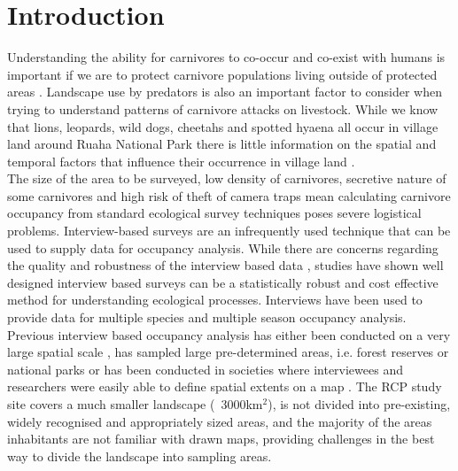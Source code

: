 \section*{Introduction}

Understanding the ability for carnivores to co-occur and co-exist with humans is important if we are to protect carnivore populations living outside of protected areas \cite{Carter2012,woodroffe2005people,Dickman2011}. Landscape use by predators is also an important factor to consider when trying to understand patterns of carnivore attacks on livestock. While we know that lions, leopards, wild dogs, cheetahs and spotted hyaena all occur in village land around Ruaha National Park \cite{Dickman2008,Abade2014g} there is little information on the spatial and temporal factors that influence their occurrence in village land \cite{Abade2014g}.\\ 

The size of the area to be surveyed, low density of carnivores, secretive nature of some carnivores and high risk of theft of camera traps mean calculating carnivore occupancy from standard ecological survey techniques poses severe logistical problems. Interview-based surveys are an infrequently used technique that can be used to supply data for occupancy analysis. While there are concerns regarding the quality and robustness of the interview based data \cite{Sheil2004}, studies have shown well designed interview based surveys can be a statistically robust and cost effective method for understanding ecological processes\cite{Meijaard2011,Polfus2014a,Gros1996}. Interviews have been used to provide data for multiple species \cite{Karanth2009,Zeller2011} and multiple season \cite{Pillay2011} occupancy analysis.\\

Previous interview based occupancy analysis has either been conducted on a very large spatial scale \cite{Karanth2009}, has sampled large pre-determined areas, i.e. forest reserves or national parks \cite{Pillay2011,Brittain2013,Pillay2014} or has been conducted in societies where interviewees and researchers were easily able to define spatial extents on a map \cite{Taubmann2015,Zeller2011,Petracca2013}. The RCP study site covers a much smaller landscape (~3000km$^2$), is not divided into pre-existing, widely recognised and appropriately sized areas, and the majority of the areas inhabitants are not familiar with drawn maps, providing challenges in the best way to divide the landscape into sampling areas.\\

